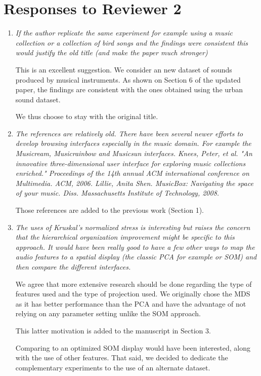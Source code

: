 \documentclass[10pt]{article}
\begin{document}
\section{Responses to Reviewer 2}


\begin{enumerate}

\item \emph{If the author replicate the same experiment for example using a music collection or a collection of bird songs and the findings were consistent 
this would justify the old title (and make the paper much stronger)}

This is an excellent suggestion. We consider an new dataset of sounds produced by musical instruments. As shown on Section 6 of the updated paper, the findings are consistent with the ones obtained using the urban sound dataset.

We thus choose to stay with the original title.

\item \emph{The references are relatively old. There have been several newer efforts to develop browsing interfaces especially in the music domain. 
For example the Musicream, Musicrainbow and Musicsun interfaces. 
Knees, Peter, et al. "An innovative three-dimensional user interface for exploring music collections enriched." Proceedings of the 14th annual ACM international conference on Multimedia. ACM, 2006.
Lillie, Anita Shen. MusicBox: Navigating the space of your music. Diss. Massachusetts Institute of Technology, 2008.}

Those references are added to the previous work (Section 1).

\item \emph{The uses of Kruskal's normalized stress is interesting but raises the concern that the hierarchical organization improvement might be specific to this approach. It would have been 
really good to have a few other ways to map the audio features to a spatial display (the classic PCA for example or SOM) and then compare the different interfaces.}

We agree that more extensive research should be done regarding the type of features used and the type of projection used. We originally chose the MDS as it has better performance than the PCA and have the advantage of not relying on any parameter setting unlike the SOM approach. 

This latter motivation is added to the manuscript in Section 3. 

Comparing to an optimized SOM display would have been interested, along with the use of other features. That said, we decided to dedicate the complementary experiments to the use of an alternate dataset.


\end{enumerate}
\end{document}
